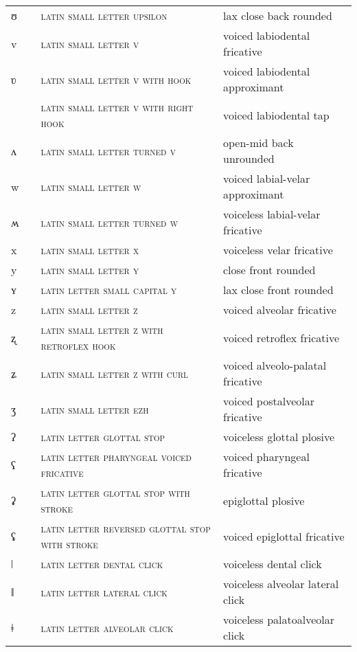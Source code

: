 \begin{center}
\begin{xtabular}{ l l L{4.5cm} L{4.5cm} }
ʊ &  & \textsc{latin small letter upsilon} & lax close back rounded \\ 
v &  & \textsc{latin small letter v} & voiced labiodental fricative \\ 
ʋ &  & \textsc{latin small letter v with hook} & voiced labiodental approximant \\ 
 &  & \textsc{latin small letter v with right hook} & voiced labiodental tap \\ 
ʌ &  & \textsc{latin small letter turned v} & open-mid back unrounded \\ 
w &  & \textsc{latin small letter w} & voiced labial-velar approximant \\ 
ʍ &  & \textsc{latin small letter turned w} & voiceless labial-velar fricative \\ 
x &  & \textsc{latin small letter x} & voiceless velar fricative \\ 
y &  & \textsc{latin small letter y} & close front rounded \\ 
ʏ &  & \textsc{latin letter small capital y} & lax close front rounded \\ 
z &  & \textsc{latin small letter z} & voiced alveolar fricative \\ 
ʐ &  & \textsc{latin small letter z with retroflex hook} & voiced retroflex fricative \\ 
ʑ &  & \textsc{latin small letter z with curl} & voiced alveolo-palatal fricative \\ 
ʒ &  & \textsc{latin small letter ezh} & voiced postalveolar fricative \\ 
ʔ &  & \textsc{latin letter glottal stop} & voiceless glottal plosive \\ 
ʕ &  & \textsc{latin letter pharyngeal voiced fricative} & voiced pharyngeal fricative \\ 
ʡ &  & \textsc{latin letter glottal stop with stroke} & epiglottal plosive \\ 
ʢ &  & \textsc{latin letter reversed glottal stop with stroke} & voiced epiglottal fricative \\ 
ǀ &  & \textsc{latin letter dental click} & voiceless dental click \\ 
ǁ &  & \textsc{latin letter lateral click} & voiceless alveolar lateral click \\ 
ǂ &  & \textsc{latin letter alveolar click} & voiceless palatoalveolar click \\ 

\end{xtabular}
\end{center}
